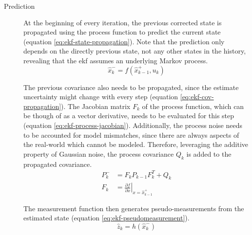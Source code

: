 \begin{description}
\item[Prediction] At the beginning of every iteration, the previous corrected state is propagated using the process function to predict the current state (equation \ref{eq:ekf-state-propagation}). Note that the prediction only depends on the directly previous state, not any other states in the history, revealing that the \gls{ekf} assumes an underlying Markov process.
\begin{equation}\label{eq:ekf-state-propagation}%
\hat{x}_k^- = f(\hat{x}_{k-1}^+, u_k)%
\end{equation}

The previous covariance also needs to be propagated, since the estimate uncertainty might change with every step (equation \ref{eq:ekf-cov-propagation}). The Jacobian matrix $F_k$ of the process function, which can be though of as a vector derivative, needs to be evaluated for this step (equation \ref{eq:ekf-process-jacobian}). Additionally, the process noise needs to be accounted for model mismatches, since there are always aspects of the real-world which cannot be modeled. Therefore, leveraging the additive property of Gaussian noise, the process covariance $Q_k$ is added to the propagated covariance.
\begin{align}\label{eq:ekf-cov-propagation}%
P_k^- &= F_k P_{k-1} F_k^T + Q_k \\%
\label{eq:ekf-process-jacobian}%
F_k &= \left. \frac{\partial f}{\partial x} \right|_{x = \hat{x}_{k-1}^+}%
\end{align}

The measurement function then generates pseudo-measurements from the estimated state (equation \ref{eq:ekf-pseudomeasurement}).
\begin{equation}\label{eq:ekf-pseudomeasurement}%
\hat{z}_k = h(\hat{x}_k^-)%
\end{equation}



\end{description}
